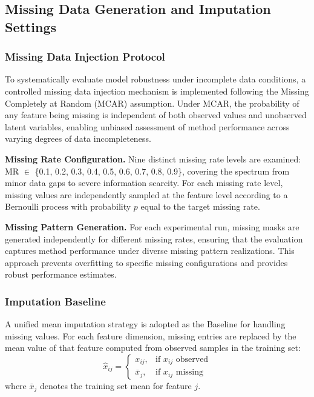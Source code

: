 \documentclass[5p,times]{elsarticle}
\begin{document}
\subsection{Missing Data Generation and Imputation Settings}\label{sec:missing}

\subsubsection{Missing Data Injection Protocol}

To systematically evaluate model robustness under incomplete data conditions, a controlled missing data injection mechanism is implemented following the Missing Completely at Random (MCAR) assumption. Under MCAR, the probability of any feature being missing is independent of both observed values and unobserved latent variables, enabling unbiased assessment of method performance across varying degrees of data incompleteness.

\textbf{Missing Rate Configuration.} Nine distinct missing rate levels are examined: MR $\in$ \{0.1, 0.2, 0.3, 0.4, 0.5, 0.6, 0.7, 0.8, 0.9\}, covering the spectrum from minor data gaps to severe information scarcity. For each missing rate level, missing values are independently sampled at the feature level according to a Bernoulli process with probability $p$ equal to the target missing rate.

\textbf{Missing Pattern Generation.} For each experimental run, missing masks are generated independently for different missing rates, ensuring that the evaluation captures method performance under diverse missing pattern realizations. This approach prevents overfitting to specific missing configurations and provides robust performance estimates.

\subsubsection{Imputation Baseline}

A unified mean imputation strategy is adopted as the Baseline for handling missing values. For each feature dimension, missing entries are replaced by the mean value of that feature computed from observed samples in the training set:
\begin{equation}
    \hat{x}_{ij} = \begin{cases}
        x_{ij}, & \text{if } x_{ij} \text{ observed} \\
        \bar{x}_j, & \text{if } x_{ij} \text{ missing}
    \end{cases}
\end{equation}
where $\bar{x}_j$ denotes the training set mean for feature $j$.
\end{document}
